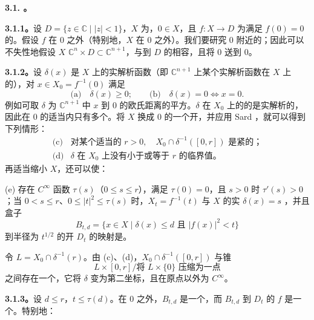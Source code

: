 \textbf{3.1. 。}

\textbf{3.1.1。}设 $D=\{z\in\mathbb C\mid |z|<1\}$，$X$ 为，$0\in X$，且 $f:X\to D$ 为满足 $f(0)=0$ 的。假设 $f$ 在 $0$ 之外（特别地，$X$ 在 $0$ 之外）。我们要研究 $0$ 附近的；因此可以不失性地假设 $X$  $\mathbb C^n\times D\subset\mathbb C^{n+1}$，与到 $D$ 的相容，且将 $0$ 送到 $0$。

\textbf{3.1.2。}设 $\delta(x)$ 是 $X$ 上的实解析函数（即 $\mathbb C^{n+1}$ 上某个实解析函数在 $X$ 上的），对 $x\in X_0=f^{-1}(0)$ 满足
\[
\text{(a)}\quad\delta(x)\geq0;\qquad
\text{(b)}\quad\delta(x)=0\Longleftrightarrow x=0.
\]
例如可取 $\delta$ 为 $\mathbb C^{n+1}$ 中 $x$ 到 $0$ 的欧氏距离的平方。$\delta$ 在 $X_0$ 上的的是实解析的，因此在 $0$ 的适当内只有多个。将 $X$ 换成 $0$ 的一个开，并应用 Sard ，就可以得到下列情形：
\[
\begin{array}{ll}
\text{(c)}&\text{对某个适当的 }r>0,\quad X_0\cap\delta^{-1}([0,r])\text{ 是紧的；}\\
\text{(d)}&\delta\text{ 在 }X_0\text{ 上没有小于或等于 }r\text{ 的临界值。}
\end{array}
\]
再适当缩小 $X$，还可以使：

(e) 存在 $C^\infty$ 函数 $\tau(s)$（$0\leq s\leq r$），满足 $\tau(0)=0$，且 $s>0$ 时 $\tau'(s)>0$；当 $0<s\leq r$、$0\leq |t|^2\leq\tau(s)$ 时，$X_t=f^{-1}(t)$ 与 $X$ 的实 $\delta(x)=s$ ，并且盒子
\[
 B_{t,d}=\{x\in X\mid \delta(x)\leq d\text{ 且 }|f(x)|^2<t\}
\]
到半径为 $t^{1/2}$ 的开 $D_t$ 的映射是。

令 $L=X_0\cap\delta^{-1}(r)$。由 (c)、(d)，$X_0\cap\delta^{-1}([0,r])$ 与锥
\[
 L\times[0,r]/\text{将 }L\times\{0\}\text{ 压缩为一点}
\]
之间存在一个，它将 $\delta$ 变为第二坐标，且在原点以外为 $C^\infty$。

\textbf{3.1.3。}设 $d\leq r$，$t\leq\tau(d)$。在 $0$ 之外，$B_{t,d}$ 是一个，而 $B_{t,d}$ 到 $D_t$ 的 $f$ 是一个。特别地：

